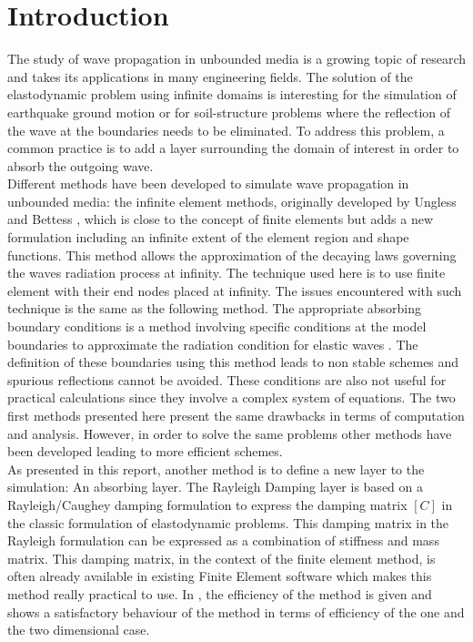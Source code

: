 
\pagestyle{plain}
\setcounter{page}{1}
\section*{Introduction}


The study of wave propagation in unbounded media is a growing topic of research and takes its applications in many engineering fields. 
The solution of the elastodynamic problem using infinite domains is interesting for the simulation of earthquake ground motion or for soil-structure problems where the reflection of the wave at the boundaries needs to be eliminated. 
To address this problem, a common practice is to add a layer surrounding the domain of interest in order to absorb the outgoing wave.   \\
Different methods have been developed to simulate wave propagation in unbounded media: the infinite element methods, originally developed by Ungless \cite{Ungless} and Bettess \cite{Bettess}, which is close to the concept of finite elements but adds a new formulation including an infinite extent of the element region and shape functions. This method allows the approximation of the decaying laws governing the waves radiation process at infinity. The technique used here is to use finite element with their end nodes placed at infinity. The issues encountered with such technique is the same as the following method.  The appropriate absorbing boundary conditions is a method involving specific conditions at the model boundaries to approximate the radiation condition for elastic waves \cite{Engquist}. The definition of these boundaries using this method leads to non stable schemes and spurious reflections cannot be avoided. These conditions are also not useful for practical calculations since they involve a complex system of equations. The two first methods presented here present the same drawbacks in terms of computation and analysis. However, in order to solve the same problems other methods have been developed leading to more efficient schemes.\\ 
As presented in this report, another method is to define a new layer to the simulation: An absorbing layer. The Rayleigh Damping layer is based on a Rayleigh/Caughey damping formulation to express the damping matrix $[C]$ in the classic formulation of elastodynamic problems. This damping matrix in the Rayleigh formulation can be expressed as a combination of stiffness and mass matrix. This damping matrix, in the context of the finite element method, is often already available in existing Finite Element software which makes this method really practical to use. In \cite{Semblat}, the efficiency of the method is given and shows a satisfactory behaviour of the method in terms of efficiency of the one and the two dimensional case. \\
